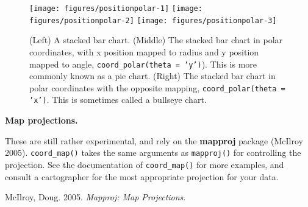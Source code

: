 \begin{figure}

{\centering \texttt{[image: figures/positionpolar-1]} \texttt{[image: figures/positionpolar-2]} \texttt{[image: figures/positionpolar-3]} 

}

\caption{(Left) A stacked bar chart.  (Middle) The stacked bar chart in polar coordinates, with x position mapped to radius and y position mapped to angle, \texttt{coord\_polar(theta = 'y')}).  This is more commonly known as a pie chart.  (Right) The stacked bar chart in polar coordinates with the opposite mapping, \texttt{coord\_polar(theta = 'x')}. This is sometimes called a bullseye chart.\label{fig:polar}}
\end{figure}

\textbf{Map projections.}

These are still rather experimental, and rely on the \textbf{mapproj}
package (McIlroy 2005). \texttt{coord\_map()} takes the same arguments
as \texttt{mapproj()} for controlling the projection. See the
documentation of \texttt{coord\_map()} for more examples, and consult a
cartographer for the most appropriate projection for your data.
 

McIlroy, Doug. 2005. \emph{Mapproj: Map Projections}.
